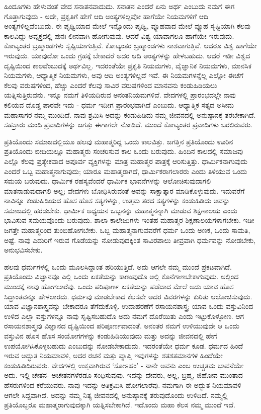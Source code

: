 ಹಿಂದೂಗಳು ಹೇಳುವಂತೆ ವೇದ ಸನಾತನವಾದುದು. ಸನಾತನ ಎಂದರೆ ಏನು ಅರ್ಥ ಎಂಬುದು ನಮಗೆ ಈಗ ಗೊತ್ತಾಗುವುದು - ಅದೇ, ಪ್ರಕೃತಿಗೆ ಹೇಗೆ ಆದಿ ಅಂತ್ಯಗಳಿಲ್ಲವೋ ಹಾಗೆಯೇ ನಿಯಮಗಳಿಗೆ ಆದಿ ಅಂತ್ಯಗಳಿಲ್ಲವೆಂಬುದು. ಈ ಪೃಥ್ವಿಯಾದ ಮೇಲೆ ಇನ್ನೊಂದು ಪೃಥ್ವಿ, ವ್ಯೂಹವಾದ ಮೇಲೆ ವ್ಯೂಹ ಸೃಷ್ಟಿಯಾಗಿ ಕೆಲವು ಕಾಲವಿದ್ದು ಅವ್ಯಕ್ತದಲ್ಲಿ ಪುನಃ ಲೀನವಾಗಿ ಹೋಗುವುವು. ಆದರೆ ವಿಶ್ವ ಯಾವಾಗಲೂ ಹಾಗೆಯೇ ಇರುವುದು. ಕೋಟ್ಯಂತರ ಬ್ರಹ್ಮಾಂಡಗಳು ಸೃಷ್ಟಿಯಾಗುತ್ತಿವೆ. ಕೋಟ್ಯಂತರ ಬ್ರಹ್ಮಾಂಡಗಳು ನಾಶವಾಗುತ್ತಿವೆ. ಆದರೂ ವಿಶ್ವ ಹಾಗೆಯೇ ಇರುವುದು. ಯಾವುದೋ ಒಂದು ಗ್ರಹಕ್ಕೆ ಬೇಕಾದರೆ ಅದರ ಆದಿ ಅಂತ್ಯಗಳನ್ನು ಹೇಳಬಹುದು. ಆದರೆ ಇಡೀ ವಿಶ್ವದ ದೃಷ್ಟಿಯಿಂದ ಕಾಲವೆಂಬುದಕ್ಕೆ ಅರ್ಥವಿಲ್ಲ. ಇದರಂತೆಯೇ ಪ್ರಕೃತಿ ನಿಯಮಗಳು, ವೈಜ್ಞಾನಿಕ ನಿಯಮಗಳು, ಮಾನಸಿಕ ನಿಯಮಗಳು, ಆಧ್ಯಾತ್ಮಿಕ ನಿಯಮಗಳು, ಅವು ಆದಿ ಅಂತ್ಯಗಳಿಲ್ಲದೆ ಇವೆ. ಈ ನಿಯಮಗಳನ್ನೆಲ್ಲ ಎಲ್ಲೋ ಈಚೆಗೆ ಕೆಲವು ವರುಷಗಳಿಂದ, ಹೆಚ್ಚು ಎಂದರೆ ಕೆಲವು ಸಾವಿರ ವರುಷಗಳಿಂದ ಮಾನವನು ಕಂಡುಹಿಡಿಯಲು ಯತ್ನಿಸುತ್ತಿರುವನು. ಇನ್ನೂ ನಮಗೆ ತಿಳಿಯದಿರುವ ಅನಂತನಿಯಮಗಳಿವೆ. ವೇದಗಳಲ್ಲಿ ಪ್ರಾರಂಭದಲ್ಲೇ ನಾವು ಕಲಿಯವ ದೊಡ್ಡ ಪಾಠವೇ ಇದು - ಧರ್ಮ ಇದೀಗ ಪ್ರಾರಂಭವಾಗಿದೆ ಎಂಬುದು. ಆಧ್ಯಾತ್ಮಿಕ ಸತ್ಯದ ಅಸೀಮ ಮಹಾಸಾಗರ ನಮ್ಮ ಮುಂದಿದೆ. ನಾವು ಶ್ರಮಿಸಿ ಅದನ್ನು ಕಂಡುಹಿಡಿದು ನಮ್ಮ ಜೀವನದಲ್ಲಿ ಅನುಷ್ಠಾನಕ್ಕೆ ತರಬೇಕಾಗಿದೆ. ಸಹಸ್ರಾರು ಮಂದಿ ಪ್ರವಾದಿಗಳನ್ನು ಜಗತ್ತು ಈಗಾಗಲೇ ನೋಡಿದೆ. ಮುಂದೆ ಕೋಟ್ಯಂತರ ಪ್ರವಾದಿಗಳು ಬರಲಿರುವರು.

ಪ್ರತಿಯೊಂದು ಸಮಾಜದಲ್ಲಿಯೂ ಹಲವು ಮಹಾತ್ಮರಿದ್ದ ಒಂದು ಕಾಲವಿತ್ತು. ಜಗತ್ತಿನ ಪ್ರತಿಯೊಂದು ಊರಿನ ಪ್ರತಿಯೊಂದು ಬೀದಿಯಲ್ಲೂ ಮಹಾತ್ಮರು ಸಂಚರಿಸುವ ಕಾಲ ಒಂದು ಬರುವುದು. ಹಿಂದಿನ ಕಾಲದಲ್ಲಿ ಸಮಾಜವು ಎಲ್ಲೊ ಕೆಲವು ಪ್ರತ್ಯೇಕವಾದ ಅಪೂರ್ವ ವ್ಯಕ್ತಿಗಳನ್ನು ಮಾತ್ರ ಮಹಾತ್ಮರ ಪಾತ್ರಕ್ಕೆ ಆರಿಸುತ್ತಿತ್ತು. ಧಾರ್ಮಿಕನಾಗುವುದು ಎಂದರೆ ಒಬ್ಬ ಮಹಾತ್ಮನಾಗುವುದು; ಯಾರೂ ಮಹಾತ್ಮರಾಗದೆ, ಧಾರ್ಮಿಕರಾಗಲಾರರು ಎಂದು ತಿಳಿಯುವ ಒಂದು ಸಮಯ ಬರುವುದು. ಧಾರ್ಮಿಕ ರಹಸ್ಯವೆಂದರೆ ಧಾರ್ಮಿಕ ಭಾವನೆಗಳನ್ನು ಆಲೋಚಿಸುವುದಾಗಲಿ ಮಾತನಾಡುವುದಾಗಲಿ ಅಲ್ಲ; ವೇದಗಳು ಬೋಧಿಸಿರುವಂತೆ ಅವನ್ನು ಸಾಕ್ಷಾತ್ಕಾರ ಮಾಡಿಕೊಳ್ಳುವುದು. ಇದುವರೆಗೆ ನಾವಿನ್ನೂ ಕಂಡುಹಿಡಿಯದ ಹೊಸ ಹೊಸ ಸತ್ಯಗಳನ್ನು, ಉತ್ತಮ ತರದ ಸತ್ಯಗಳನ್ನು ಕಂಡುಹಿಡಿದು ಅವನ್ನು ಸಮಾಜದಲ್ಲಿ ಹರಡಬೇಕು. ಧಾರ್ಮಿಕ ಅಧ್ಯಯನ ಒಬ್ಬನನ್ನು ಮಹಾತ್ಮನನ್ನಾಗಿ ಮಾಡುವ ಶಿಕ್ಷಣಾಲಯ ಎಂದು ಭಾವಿಸುವ ಸಮಯವೊಂದು ಬರುವುದು. ಶಾಲಾ ಕಾಲೇಜುಗಳು ಇಂತಹ ಮಹಾತ್ಮರ ಶಿಕ್ಷಣಾಲಯಗಳಾಗಬೇಕು. ಇಡೀ ಜಗತ್ತೇ ಮಹಾತ್ಮರಿಂದ ತುಂಬಿಹೋಗಬೇಕು. ಒಬ್ಬ ಮಹಾತ್ಮನಾಗುವವರೆಗೆ ಧರ್ಮ ಒಂದು ಅಣಕ, ಒಂದು ಸಾಮತಿ, ಅಷ್ಟೆ. ನಾವು ಎದುರಿಗೆ ಇರುವ ಗೊಡೆಯನ್ನು ನೋಡುವುದಕ್ಕಿಂತ ಸಾವಿರಪಾಲು ತೀವ್ರವಾಗಿ ಧರ್ಮವನ್ನು ನೋಡಬೇಕು, ಅನುಭವಿಸಬೇಕು.

ಹಲವು ಧರ್ಮಗಳಲ್ಲಿ ಒಂದು ಮೂಲಸಿದ್ದಾಂತ ಹರಿಯುತ್ತಿದೆ. ಅದು ಆಗಲೇ ನಮ್ಮ ಮುಂದೆ ಪ್ರಕಟವಾಗಿದೆ. ಪ್ರತಿಯೊಂದು ವಿಜ್ಞಾನವೂ ಎಲ್ಲಿ ಒಂದು ಏಕತೆಯನ್ನು ಕಾಣುವುದೊ ಅಲ್ಲಿ ಕೊನೆಗಾಣಬೇಕಾಗುವುದು. ಅಲ್ಲಿಂದ ಮುಂದಕ್ಕೆ ನಾವು ಹೋಗಲಾರೆವು. ಒಂದು ಪರಿಪೂರ್ಣ ಏಕತೆಯನ್ನು ಪಡೆದಾದ ಮೇಲೆ ಅದು ಯಾವ ಹೊಸ ಸಿದ್ದಾಂತವನ್ನೂ ಹೇಳಲಾರದು. ಧರ್ಮವು ಮಾಡಬೇಕಾದ ಕೆಲಸವೇ ಅದರ ವಿವರಗಳನ್ನು ಕುರಿತು ಆಲೋಚಿಸುವುದು. ಯಾವ ವಿಜ್ಞಾನಶಾಸ್ತ್ರವನ್ನು ಬೇಕಾದರೂ ತೆಗೆದುಕೊಳ್ಳಿ. ಉದಾಹರಣೆಗೆ ರಸಾಯನಶಾಸ್ತ್ರ; ಯಾವ ಒಂದು ವಸ್ತುವಿನಿಂದ ಉಳಿದ ಎಲ್ಲಾ ವಸ್ತುಗಳನ್ನೂ ನಾವು ಸೃಷ್ಟಿಸಬಹುದೊ ಅದು ನಮಗೆ ದೊರೆಯಿತು ಎಂದು ಇಟ್ಟುಕೊಳ್ಳೋಣ. ಆಗ ರಸಾಯನಶಾಸ್ತ್ರವು ವಿಜ್ಞಾನದ ದೃಷ್ಟಿಯಿಂದ ಪರಿಪೂರ್ಣವಾದಂತೆ. ಅನಂತರ ನಮಗೆ ಉಳಿಯುವುದೇ ಆ ಒಂದು ವಸ್ತುವಿನ ಹೊಸ ಹೊಸ ಸಂಯೋಗಗಳನ್ನು ಕಂಡುಹಿಡಿಯುವುದು ಮತ್ತು ಅದನ್ನು ಜೀವನದಲ್ಲಿ ಹೇಗೆ ಉಪಯೋಗಿಸಿಕೊಳ್ಳಬಹುದು ಎಂಬುದನ್ನು ನೋಡಬೇಕಾದುದು. ಇದರಂತೆಯೇ ಧರ್ಮ ಕೂಡ. ಧರ್ಮದ ಹಿಂದೆ ಇರುವ ಅದ್ಭುತ ನಿಯಮಾವಳಿ, ಅದರ ರಚನೆ ಮತ್ತು ವ್ಯಾಪ್ತಿ ಇವುಗಳನ್ನು ಶತಶತಮಾನಗಳ ಹಿಂದೆಯೇ ಕಂಡುಹಿಡಿದಿರುವರು. ವೇದಗಳಲ್ಲಿ ಉಕ್ತವಾಗಿರುವ `ಸೋಽಹಂ' - ನಾನೇ ಅವನು ಎಂಬ ಉಚ್ಚತಮ ಭಾವನೆಯೇ ಅದು. ಇಲ್ಲಿ ಚೇತನ- ಅಚೇತನಗಳೆರಡೂ ಸಂಧಿಸುವುವು. ಇದನ್ನು ದೇವರು, ಅಲ್ಲ, ಬ್ರಹ್ಮ, ಜಿಹೋವ ಮುಂತಾದ ಹೆಸರುಗಳಿಂದ ಕರೆಯುವರು. ನಾವು ಇದನ್ನು ಅತಿಕ್ರಮಿಸಿ ಹೋಗಲಾರೆವು. ನಮಗಾಗಿ ಈ ಅದ್ಭುತ ನಿಯಮಾವಳಿ ಆಗಲೇ ಸಿದ್ದವಾಗಿದೆ. ಅದನ್ನು ನಮ್ಮ ನಿತ್ಯ ಜೀವನದಲ್ಲಿ ಅನುಷ್ಠಾನಕ್ಕೆ ತರುವುದೊಂದು ಉಳಿದಿದೆ. ನಮ್ಮಲ್ಲಿ ಪ್ರತಿಯೊಬ್ಬರೂ ಮಹಾತ್ಮರಾಗುವುದಕ್ಕಾಗಿ ಯತ್ನಿಸಬೇಕಾಗಿದೆ. ಇದೊಂದು ಮಹಾ ಕೆಲಸ ನಮ್ಮ ಮುಂದೆ ಇದೆ.

